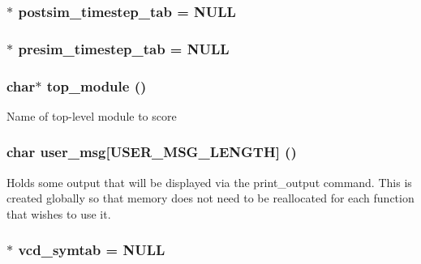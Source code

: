 \subsubsection{$\ast$ {\bf postsim\_\-timestep\_\-tab} = NULL}\label{db_8c_a17}


\subsubsection{$\ast$ {\bf presim\_\-timestep\_\-tab} = NULL}\label{db_8c_a16}


\subsubsection{\setlength{\rightskip}{0pt plus 5cm}char$\ast$ {\bf top\_\-module} ()}\label{db_8c_a0}


Name of top-level module to score 
\subsubsection{\setlength{\rightskip}{0pt plus 5cm}char {\bf user\_\-msg}[USER\_\-MSG\_\-LENGTH] ()}\label{db_8c_a6}


Holds some output that will be displayed via the print\_\-output command. This is created globally so that memory does not need to be reallocated for each function that wishes to use it. 
\subsubsection{$\ast$ {\bf vcd\_\-symtab} = NULL}\label{db_8c_a15}



